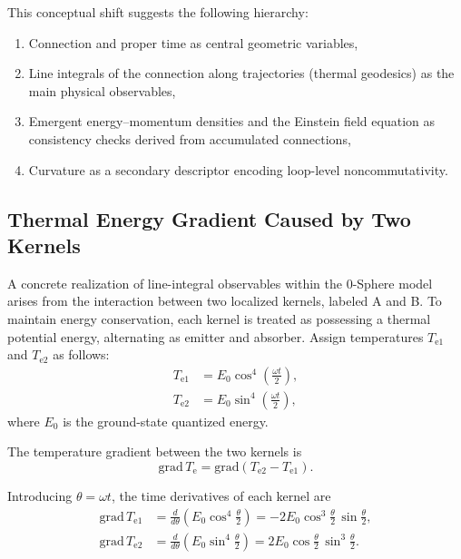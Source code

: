 \documentclass[%
 reprint,
 amsmath,amssymb,
 aps,
 prb,
]{revtex4-2}
\numberwithin{equation}{section}
\begin{document}
This conceptual shift suggests the following hierarchy:
\begin{enumerate}
\item Connection and proper time as central geometric variables,
\item Line integrals of the connection along trajectories (thermal geodesics) as the main physical observables,
\item Emergent energy--momentum densities and the Einstein field equation as consistency checks derived from accumulated connections,
\item Curvature as a secondary descriptor encoding loop-level noncommutativity.
\end{enumerate}

\clearpage

\subsection{Thermal Energy Gradient Caused by Two Kernels}
\label{sec:thermal_geodesic_equation}

A concrete realization of line-integral observables within the 0-Sphere model arises from the interaction between two localized kernels, labeled A and B. To maintain energy conservation, each kernel is treated as possessing a thermal potential energy, alternating as emitter and absorber. Assign temperatures $T_{\mathrm{e1}}$ and $T_{\mathrm{e2}}$ as follows:
\begin{equation}
\begin{split}
T_{\mathrm{e1}} &= E_0 \cos^4 \left( \frac{\omega t}{2} \right), \\
T_{\mathrm{e2}} &= E_0 \sin^4 \left( \frac{\omega t}{2} \right),
\end{split}
\label{eq:Te1Te2}
\end{equation}
where $E_0$ is the ground-state quantized energy.

The temperature gradient between the two kernels is
\begin{equation}
\mathrm{grad} \, T_\mathrm{e} = \mathrm{grad} \left( T_{\mathrm{e2}} - T_{\mathrm{e1}} \right).
\label{eq:grad_Te}
\end{equation}

Introducing $\theta = \omega t$, the time derivatives of each kernel are
\begin{align}
\mathrm{grad} \, T_{\mathrm{e1}} &= \frac{d}{d\theta} \left( E_0 \cos^4 \frac{\theta}{2} \right) = -2 E_0 \cos^3 \frac{\theta}{2} \, \sin \frac{\theta}{2}, \\
\mathrm{grad} \, T_{\mathrm{e2}} &= \frac{d}{d\theta} \left( E_0 \sin^4 \frac{\theta}{2} \right) = 2 E_0 \cos \frac{\theta}{2} \, \sin^3 \frac{\theta}{2}.
\end{align}
\end{document}
